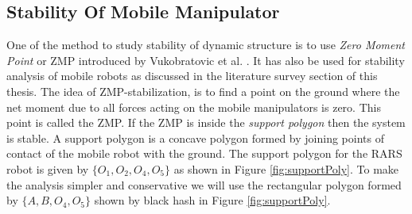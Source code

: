 \subsection{Stability Of Mobile Manipulator}
One of the method to study stability of dynamic structure is to use \textit{Zero Moment Point} or ZMP introduced by Vukobratovic et al. \cite{vukobratovic1969contribution,vukobratovic2012biped}. It has also be used for stability analysis of mobile robots as discussed in the literature survey section of this thesis.
The idea of ZMP-stabilization,  is to find a point on the ground where the net  moment due to all forces acting on the mobile manipulators is zero. This point is called the ZMP. If the ZMP is inside the \textit{support polygon} then the system is stable. A support polygon is a concave polygon formed by joining points of contact of the mobile robot with the ground. The support polygon for the RARS robot is given by $\{O_1,O_2,O_4,O_5\}$ as shown in Figure \ref{fig:supportPoly}. To make the analysis simpler and conservative we will use the rectangular polygon formed by $\{A, B,O_4,O_5\}$ shown by black hash in Figure \ref{fig:supportPoly}. 


